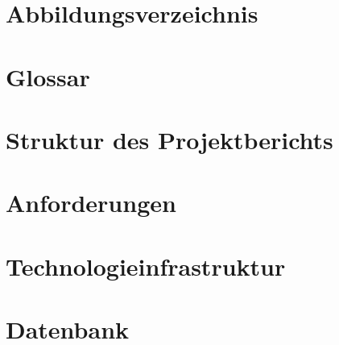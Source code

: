\documentclass[a4paper,12pt,oneside]{article}
\begin{document}

\newpage

\tableofcontents
\pagestyle{fancy} %

\newpage
\section*{Abbildungsverzeichnis}
\renewcommand{\listfigurename}{} %
\thispagestyle{empty}
\listoffigures

\section*{Glossar}%


\newpage
\section*{Struktur des Projektberichts}\label{kap_struktur}


\newpage
\section{Anforderungen}\label{kap_anforderungen}


\newpage
\section{Technologieinfrastruktur}\label{kap_Technologieinfrastruktur}


\newpage
\section{Datenbank}\label{kap_Datenbank}

\end{document}
